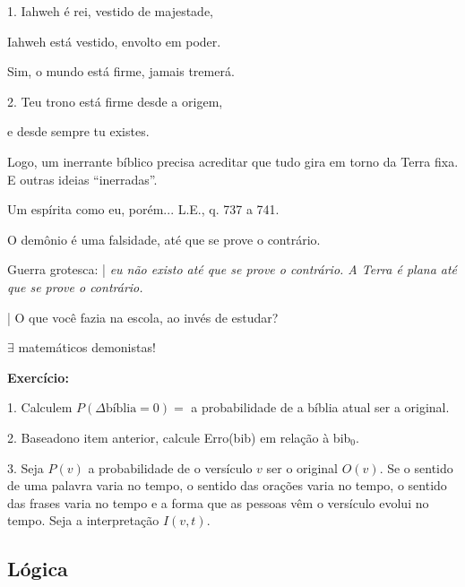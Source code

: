 \documentclass[12pt,a4paper]{article}
\begin{document}
			1. Iahweh \'e rei, vestido de majestade,

			Iahweh est\'a vestido, envolto em poder.

			Sim, o mundo est\'a firme, jamais tremer\'a.

			2. Teu trono est\'a firme desde a origem,

			e desde sempre tu existes.

			Logo, um inerrante b\'iblico precisa acreditar que tudo gira em torno da Terra fixa. E outras ideias \textquotedblleft inerradas\textquotedblright.

			Um esp\'irita como eu, por\'em... L.E., q. 737 a 741.

			\begin{flushright}
			\end{flushright}

O dem\^onio \'e uma falsidade, at\'e que se prove o contr\'ario.

Guerra grotesca: | \emph{eu n\~ao existo at\'e que se prove o contr\'ario. A
Terra \'e plana at\'e que se prove o contr\'ario.}

| O que voc\^e fazia na escola, ao inv\'es de estudar?

			\begin{flushright}
			\end{flushright}

			$\exists$ matem\'aticos demonistas!

			\textbf{Exerc\'icio:}

			1. Calculem $P(\Delta \mbox{b\'iblia} = 0) = $ a probabilidade de a b\'iblia atual ser a original.

			2. Baseado\footnotemark[1] no item anterior, calcule Erro(bib) em rela\c{c}\~ao \`a bib$_0$.


3. Seja $P(v)$ a probabilidade de o vers\'iculo $v$ ser o original $O(v)$. Se o sentido de uma palavra varia no tempo, o sentido das ora\c{c}\~oes varia no tempo, o sentido das frases varia no tempo e a forma que as pessoas v\^em o vers\'iculo evolui no tempo. Seja a interpreta\c{c}\~ao $I(v, t)$.

		\subsection{L\'ogica}
			\begin{flushright}
			\end{flushright}
\end{document}
